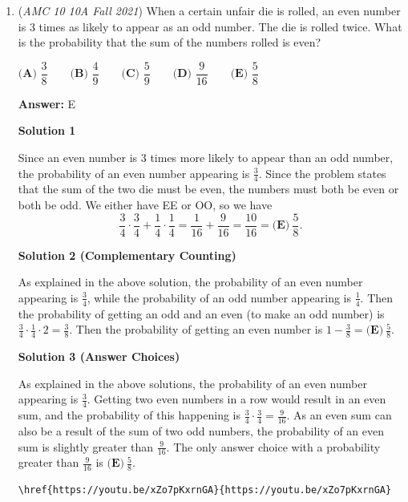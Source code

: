 \begin{enumerate}
 


 


	\item (\textit{AMC 10 10A Fall 2021}) When a certain unfair die is rolled, an even number is $3$ times as likely to appear as an odd number. The die is rolled twice. What is the probability that the sum of the numbers rolled is even?


 $\textbf{(A) }\dfrac38\qquad\textbf{(B) }\dfrac49\qquad\textbf{(C) }\dfrac59\qquad\textbf{(D) }\dfrac9{16}\qquad\textbf{(E) }\dfrac58$

 \textbf{Answer: }E



\textbf{Solution 1}

Since an even number is $3$ times more likely to appear than an odd number, the probability of an even number appearing is $\frac{3}{4}$. Since the problem states that the sum of the two die must be even, the numbers must both be even or both be odd. We either have EE or OO, so we have 
 \[\frac{3}{4}\cdot \frac{3}{4} + \frac{1}{4} \cdot \frac{1}{4} = \frac {1}{16} + \frac {9}{16} = \frac{10}{16} = \boxed{\textbf{(E)}\ \frac{5}{8}}.\]




\textbf{Solution 2 (Complementary Counting)}

As explained in the above solution, the probability of an even number appearing is $\frac{3}{4}$, while the probability of an odd number appearing is $\frac{1}{4}$. Then the probability of getting an odd and an even (to make an odd number) is $\frac{3}{4} \cdot \frac{1}{4} \cdot 2 = \frac{3}{8}.$ Then the probability of getting an even number is $1 - \frac{3}{8} = \boxed{\textbf{(E)}\ \frac{5}{8}}.$




\textbf{Solution 3 (Answer Choices)}

As explained in the above solutions, the probability of an even number appearing is $\frac{3}{4}$. Getting two even numbers in a row would result in an even sum, and the probability of this happening is $\frac{3}{4} \cdot \frac{3}{4} = \frac{9}{16}.$ As an even sum can also be a result of the sum of two odd numbers, the probability of an even sum is slightly greater than $\frac{9}{16}$. The only answer choice with a probability greater than $\frac{9}{16}$ is $\boxed{\textbf{(E)}\ \frac{5}{8}}.$
\begin{verbatim}
\href{https://youtu.be/xZo7pKxrnGA}{https://youtu.be/xZo7pKxrnGA}
\end{verbatim}





\end{enumerate}
